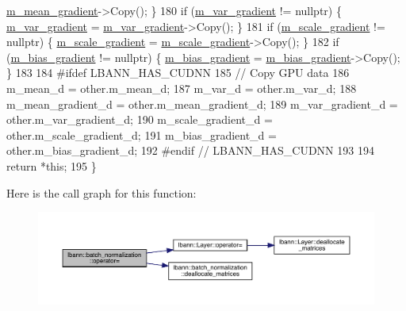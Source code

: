 \begin{DoxyCode}
      \hyperlink{classlbann_1_1batch__normalization_aa4677c2f7d5ea27c53bf0f61f280a2a3}{m\_mean\_gradient}->Copy(); \}
180     \textcolor{keywordflow}{if} (\hyperlink{classlbann_1_1batch__normalization_aa2d2050a265eed854aa8950cd1461af9}{m\_var\_gradient} != \textcolor{keyword}{nullptr})   \{ \hyperlink{classlbann_1_1batch__normalization_aa2d2050a265eed854aa8950cd1461af9}{m\_var\_gradient} = 
      \hyperlink{classlbann_1_1batch__normalization_aa2d2050a265eed854aa8950cd1461af9}{m\_var\_gradient}->Copy(); \}
181     \textcolor{keywordflow}{if} (\hyperlink{classlbann_1_1batch__normalization_a66364e1b0c9afb40a4c03ee1869d264c}{m\_scale\_gradient} != \textcolor{keyword}{nullptr}) \{ \hyperlink{classlbann_1_1batch__normalization_a66364e1b0c9afb40a4c03ee1869d264c}{m\_scale\_gradient} = 
      \hyperlink{classlbann_1_1batch__normalization_a66364e1b0c9afb40a4c03ee1869d264c}{m\_scale\_gradient}->Copy(); \}
182     \textcolor{keywordflow}{if} (\hyperlink{classlbann_1_1batch__normalization_aa0f1e9a9f48f67544618e239167494bb}{m\_bias\_gradient} != \textcolor{keyword}{nullptr})  \{ \hyperlink{classlbann_1_1batch__normalization_aa0f1e9a9f48f67544618e239167494bb}{m\_bias\_gradient} = 
      \hyperlink{classlbann_1_1batch__normalization_aa0f1e9a9f48f67544618e239167494bb}{m\_bias\_gradient}->Copy(); \}
183 
184 \textcolor{preprocessor}{  #ifdef LBANN\_HAS\_CUDNN}
185     \textcolor{comment}{// Copy GPU data}
186     m\_mean\_d = other.m\_mean\_d;
187     m\_var\_d = other.m\_var\_d;
188     m\_mean\_gradient\_d = other.m\_mean\_gradient\_d;
189     m\_var\_gradient\_d = other.m\_var\_gradient\_d;
190     m\_scale\_gradient\_d = other.m\_scale\_gradient\_d;
191     m\_bias\_gradient\_d = other.m\_bias\_gradient\_d;
192 \textcolor{preprocessor}{  #endif // LBANN\_HAS\_CUDNN}
193 
194     \textcolor{keywordflow}{return} *\textcolor{keyword}{this};
195   \}
\end{DoxyCode}
Here is the call graph for this function\+:\nopagebreak
\begin{figure}[H]
\begin{center}
\leavevmode
\includegraphics[width=350pt]{classlbann_1_1batch__normalization_aeb3c03a8dd166a64a77a26ee06ba81cd_cgraph}
\end{center}
\end{figure}
\mbox{\label{classlbann_1_1batch__normalization_ac046a5ab567cc01f9a36c6b0fc4e3b55}} 
